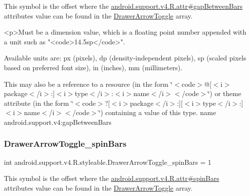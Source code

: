 This symbol is the offset where the \hyperlink{classandroid_1_1support_1_1v4_1_1R_1_1attr_a2816042f891807fadc5b644a75c9857f}{android.\+support.\+v4.\+R.\+attr\#gap\+Between\+Bars} attribute\textquotesingle{}s value can be found in the \hyperlink{classandroid_1_1support_1_1v4_1_1R_1_1styleable_af08d693b5d7faf0f18822ffe29c6028c}{Drawer\+Arrow\+Toggle} array.

\begin{DoxyVerb}      <p>Must be a dimension value, which is a floating point number appended with a unit such as "<code>14.5sp</code>".
\end{DoxyVerb}
 Available units are\+: px (pixels), dp (density-\/independent pixels), sp (scaled pixels based on preferred font size), in (inches), mm (millimeters). 

This may also be a reference to a resource (in the form \char`\"{}$<$code$>$@\mbox{[}$<$i$>$package$<$/i$>$\+:\mbox{]}$<$i$>$type$<$/i$>$\+:$<$i$>$name$<$/i$>$$<$/code$>$\char`\"{}) or theme attribute (in the form \char`\"{}$<$code$>$?\mbox{[}$<$i$>$package$<$/i$>$\+:\mbox{]}\mbox{[}$<$i$>$type$<$/i$>$\+:\mbox{]}$<$i$>$name$<$/i$>$$<$/code$>$\char`\"{}) containing a value of this type.  name android.\+support.\+v4\+:gap\+Between\+Bars \mbox{\label{classandroid_1_1support_1_1v4_1_1R_1_1styleable_a59eac02900e4f8c75b5cef8e7f80ef10}} 
\subsubsection{\texorpdfstring{Drawer\+Arrow\+Toggle\+\_\+spin\+Bars}{DrawerArrowToggle\_spinBars}}
{\footnotesize\ttfamily int android.\+support.\+v4.\+R.\+styleable.\+Drawer\+Arrow\+Toggle\+\_\+spin\+Bars = 1\hspace{0.3cm}{\ttfamily [static]}}

This symbol is the offset where the \hyperlink{classandroid_1_1support_1_1v4_1_1R_1_1attr_a5694b740c43f723768b3b198529ace85}{android.\+support.\+v4.\+R.\+attr\#spin\+Bars} attribute\textquotesingle{}s value can be found in the \hyperlink{classandroid_1_1support_1_1v4_1_1R_1_1styleable_af08d693b5d7faf0f18822ffe29c6028c}{Drawer\+Arrow\+Toggle} array.


